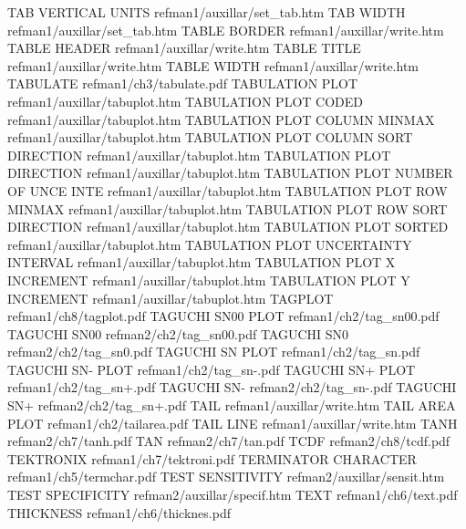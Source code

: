 TAB VERTICAL UNITS                      refman1/auxillar/set_tab.htm
TAB WIDTH                               refman1/auxillar/set_tab.htm
TABLE BORDER                            refman1/auxillar/write.htm
TABLE HEADER                            refman1/auxillar/write.htm
TABLE TITLE                             refman1/auxillar/write.htm
TABLE WIDTH                             refman1/auxillar/write.htm
TABULATE                                refman1/ch3/tabulate.pdf
TABULATION PLOT                         refman1/auxillar/tabuplot.htm
TABULATION PLOT CODED                   refman1/auxillar/tabuplot.htm
TABULATION PLOT COLUMN MINMAX           refman1/auxillar/tabuplot.htm
TABULATION PLOT COLUMN SORT DIRECTION   refman1/auxillar/tabuplot.htm
TABULATION PLOT DIRECTION               refman1/auxillar/tabuplot.htm
TABULATION PLOT NUMBER OF UNCE INTE     refman1/auxillar/tabuplot.htm
TABULATION PLOT ROW MINMAX              refman1/auxillar/tabuplot.htm
TABULATION PLOT ROW SORT DIRECTION      refman1/auxillar/tabuplot.htm
TABULATION PLOT SORTED                  refman1/auxillar/tabuplot.htm
TABULATION PLOT UNCERTAINTY INTERVAL    refman1/auxillar/tabuplot.htm
TABULATION PLOT X INCREMENT             refman1/auxillar/tabuplot.htm
TABULATION PLOT Y INCREMENT             refman1/auxillar/tabuplot.htm
TAGPLOT                                 refman1/ch8/tagplot.pdf
TAGUCHI SN00 PLOT                       refman1/ch2/tag_sn00.pdf
TAGUCHI SN00                            refman2/ch2/tag_sn00.pdf
TAGUCHI SN0                             refman2/ch2/tag_sn0.pdf
TAGUCHI SN PLOT                         refman1/ch2/tag_sn.pdf
TAGUCHI SN- PLOT                        refman1/ch2/tag_sn-.pdf
TAGUCHI SN+ PLOT                        refman1/ch2/tag_sn+.pdf
TAGUCHI SN-                             refman2/ch2/tag_sn-.pdf
TAGUCHI SN+                             refman2/ch2/tag_sn+.pdf
TAIL                                    refman1/auxillar/write.htm
TAIL AREA PLOT                          refman1/ch2/tailarea.pdf
TAIL LINE                               refman1/auxillar/write.htm
TANH                                    refman2/ch7/tanh.pdf
TAN                                     refman2/ch7/tan.pdf
TCDF                                    refman2/ch8/tcdf.pdf
TEKTRONIX                               refman1/ch7/tektroni.pdf
TERMINATOR CHARACTER                    refman1/ch5/termchar.pdf
TEST SENSITIVITY                        refman2/auxillar/sensit.htm
TEST SPECIFICITY                        refman2/auxillar/specif.htm
TEXT                                    refman1/ch6/text.pdf
THICKNESS                               refman1/ch6/thicknes.pdf

